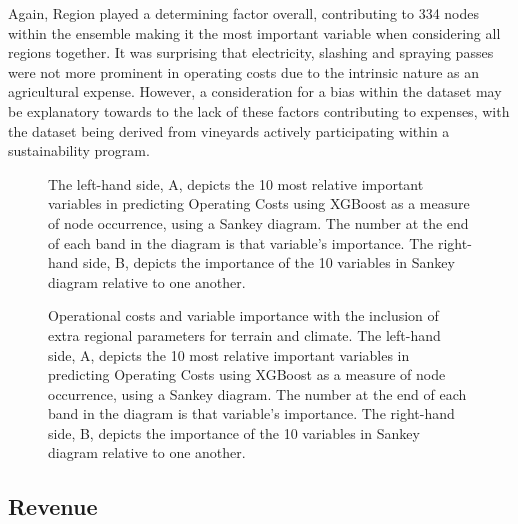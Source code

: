 \documentclass[review,12pt,authoryear]{elsarticle}
\begin{document}
\begin{linenumbers}
\par
Again, Region played a determining factor overall, contributing to 334 nodes within the ensemble making it the most important variable when considering all regions together. It was surprising that electricity, slashing and spraying passes were not more prominent in operating costs due to the intrinsic nature as an agricultural expense. However, a consideration for a bias within the dataset may be explanatory towards to the lack of these factors contributing to expenses, with the dataset being derived from vineyards actively participating within a sustainability program.
\par
\begin{figure}[htb]
  \caption{The left-hand side, A,  depicts the 10 most relative  important variables in predicting Operating Costs using XGBoost as a measure of node occurrence, using a Sankey diagram. The number at the end of each band in the diagram is that variable's importance. The right-hand side, B, depicts the importance of the 10 variables in Sankey diagram relative to one another.}\label{fig:operating_costs_sankey}
\end{figure}

\begin{figure}[htb]
  \caption{Operational costs and variable importance with the inclusion of extra regional parameters for terrain and climate. The left-hand side, A,  depicts the 10 most relative  important variables in predicting Operating Costs using XGBoost as a measure of node occurrence, using a Sankey diagram. The number at the end of each band in the diagram is that variable's importance. The right-hand side, B, depicts the importance of the 10 variables in Sankey diagram relative to one another.}\label{fig:operating_costs_sankey_extra}
\end{figure}

\subsection{Revenue}


\end{linenumbers}
\end{document}
